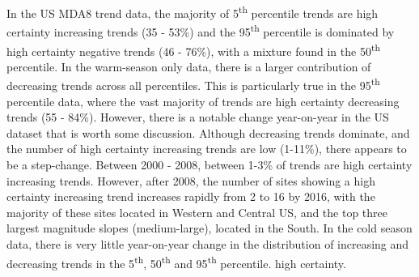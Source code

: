 \documentclass[journal abbreviation, manuscript]{copernicus}
\begin{document}
In the US MDA8 trend data, the majority of 5\textsuperscript{th} percentile trends are high certainty increasing trends (35 - 53\%) and the 95\textsuperscript{th} percentile is dominated by high certainty negative trends (46 - 76\%), with a mixture found in the 50\textsuperscript{th} percentile. In the warm-season only data, there is a larger contribution of decreasing trends across all percentiles. This is particularly true in the 95\textsuperscript{th} percentile data, where the vast majority of trends are high certainty decreasing trends (55 - 84\%). However, there is a notable change year-on-year in the US dataset that is worth some discussion. Although decreasing trends dominate, and the number of high certainty increasing trends are low (1-11\%), there appears to be a step-change. Between 2000 - 2008, between 1-3\% of trends are high certainty increasing trends. However, after 2008, the number of sites showing a high certainty increasing trend increases rapidly from 2 to 16 by 2016, with the majority of these sites located in Western and Central US, and the top three largest magnitude slopes (medium-large), located in the South. In the cold season data, there is very little year-on-year change in the distribution of increasing and decreasing trends in the 5\textsuperscript{th}, 50\textsuperscript{th} and 95\textsuperscript{th} percentile. high certainty.
\end{document}
